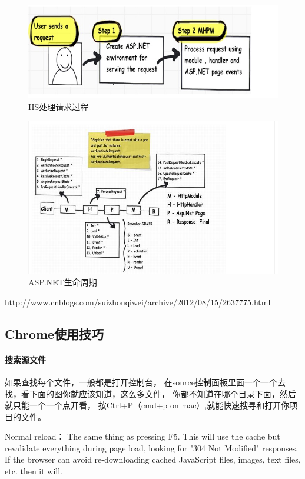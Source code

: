 \documentclass{book}
\begin{document}
\begin{figure}[htbp]
	\centering
	\includegraphics[scale=0.8]{IISHandleUserRequest.png}
	\caption{IIS处理请求过程}
	\label{fig:IISHandleUserRequest}
\end{figure}

\begin{figure}[htbp]
	\centering
	\includegraphics[scale=0.8]{TheWholeLifeCycleOfHttp.png}
	\caption{ASP.NET生命周期}
	\label{fig:TheWholeLifeCycleOfHttp}
\end{figure}
http://www.cnblogs.com/suizhouqiwei/archive/2012/08/15/2637775.html

\subsection{Chrome使用技巧}

\paragraph{搜索源文件}
如果查找每个文件，一般都是打开控制台，
在source控制面板里面一个一个去找，看下面的图你就应该知道，这么多文件，
你都不知道在哪个目录下面，然后就只能一个一个点开看，
按Ctrl+P（cmd+p on mac）,就能快速搜寻和打开你项目的文件。

Normal reload：
The same thing as pressing F5. This will use the cache but revalidate everything during page load, 
looking for "304 Not Modified" responses. If the browser can avoid re-downloading cached JavaScript files, images, text files, etc. then it will.
\end{document}
